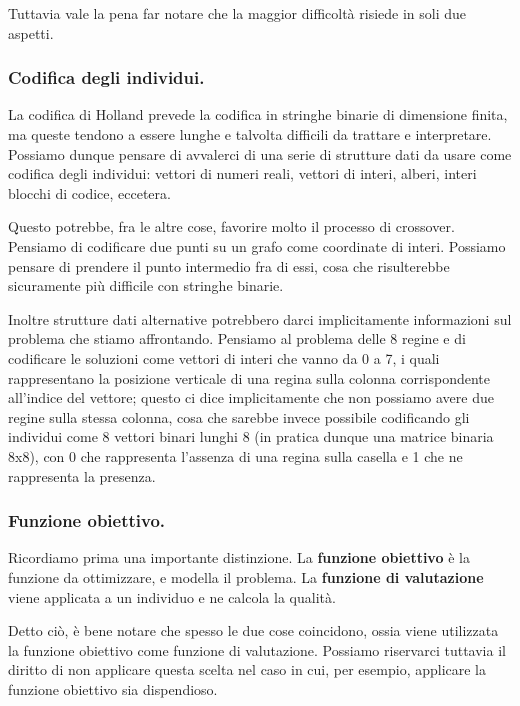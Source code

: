             Tuttavia vale la pena far notare che la maggior difficoltà risiede in soli due aspetti.
        
            \subsubsection{Codifica degli individui.}
                La codifica di Holland prevede la codifica in stringhe binarie di dimensione finita, ma queste tendono a essere lunghe e talvolta difficili da trattare e interpretare. Possiamo dunque pensare di avvalerci di una serie di strutture dati da usare come codifica degli individui: vettori di numeri reali, vettori di interi, alberi, interi blocchi di codice, eccetera.
                
                Questo potrebbe, fra le altre cose, favorire molto il processo di crossover. Pensiamo di codificare due punti su un grafo come coordinate di interi. Possiamo pensare di prendere il punto intermedio fra di essi, cosa che risulterebbe sicuramente più difficile con stringhe binarie.
                
                Inoltre strutture dati alternative potrebbero darci implicitamente informazioni sul problema che stiamo affrontando. Pensiamo al problema delle 8 regine e di codificare le soluzioni come vettori di interi che vanno da 0 a 7, i quali rappresentano la posizione verticale di una regina sulla colonna corrispondente all'indice del vettore; questo ci dice implicitamente che non possiamo avere due regine sulla stessa colonna, cosa che sarebbe invece possibile codificando gli individui come 8 vettori binari lunghi 8 (in pratica dunque una matrice binaria 8x8), con 0 che rappresenta l'assenza di una regina sulla casella e 1 che ne rappresenta la presenza.
            
            
            \subsubsection{Funzione obiettivo.}
                Ricordiamo prima una importante distinzione. La \textbf{funzione obiettivo} è la funzione da ottimizzare, e modella il problema. La \textbf{funzione di valutazione} viene applicata a un individuo e ne calcola la qualità.
                
                Detto ciò, è bene notare che spesso le due cose coincidono, ossia viene utilizzata la funzione obiettivo come funzione di valutazione. Possiamo riservarci tuttavia il diritto di non applicare questa scelta nel caso in cui, per esempio, applicare la funzione obiettivo sia dispendioso.
                
